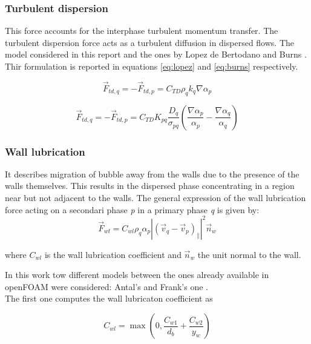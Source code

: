 \documentclass[11pt,a4paper]{article}
\begin{document}
\subsubsection{Turbulent dispersion}
This force accounts for the interphase turbulent momentum transfer. The turbulent dispersion force acts as a turbulent diffusion in dispersed flows. The model considered in this report and the ones by Lopez de Bertodano \cite{debertodano} and Burns \cite{burns}. Thir formulation is reported in equations \ref{eq:lopez} and \ref{eq:burns} respectively.

\begin{equation}
\vec{F}_{t d, q}=-\vec{F}_{t d, p}=C_{T D} \rho_{q} k_{q} \nabla \alpha_{p}
\label{eq:lopez}
\end{equation}




\begin{equation}
\vec{F}_{t d, q}=-\vec{F}_{t d, p}=C_{T D} K_{p q} \frac{D_{q}}{\sigma_{p q}}\left(\frac{\nabla \alpha_{p}}{\alpha_{p}}-\frac{\nabla \alpha_{q}}{\alpha_{q}}\right)
\label{eq:burns}
\end{equation}



\subsubsection{Wall lubrication}
It describes migration of bubble away from the walls due to the presence of the walls themselves. This results in the dispersed phase concentrating in a region near but not adjacent to the walls. The general expression of the wall lubrication force acting on a secondari phase \textit{p} in a primary phase \textit{q} is given by:
\begin{equation}
\vec{F}_{w l}=C_{w l} \rho_{q} \alpha_{p}\left|\left(\vec{v}_{q}-\vec{v}_{p}\right)_{\|}\right|^{2} \vec{n}_{w}
\end{equation}

where $C_{w l}$ is the wall lubrication coefficient and $\vec{n}_{w}$ the unit normal to the wall.

In this work tow different models between the ones already available in openFOAM were considered: Antal's \cite{antal} and Frank's one \cite{frank}.\\

The first one computes the wall lubricaton coefficient as

\begin{equation}
C_{w l}=\max \left(0, \frac{C_{w 1}}{d_{b}}+\frac{C_{w 2}}{y_{w}}\right)
\end{equation}
\end{document}
